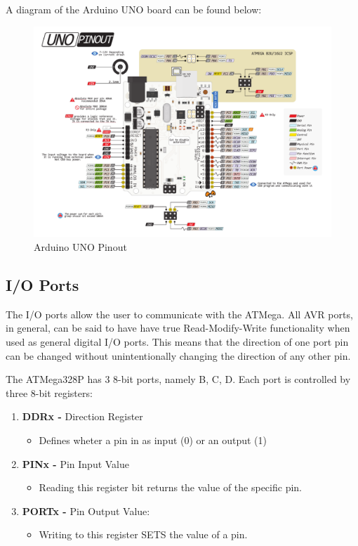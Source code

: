 A diagram of the Arduino UNO board can be found below:

\begin{figure}[H]
    \centering
    \includegraphics[scale = 0.50]{Graphics/MICROS/Practice 1/ARDUINO/BOARD.pdf}
    \caption{Arduino UNO Pinout~\autocite{BQ_ARDUINO}}
    \label{fig:ARDUINO_UNO_BOARD}
\end{figure}

\subsection{I/O Ports}

The I/O ports allow the user to communicate with the ATMega. All AVR ports, in general, can be said to have have true Read-Modify-Write functionality when used as general digital I/O ports. This means that the direction of one port pin can be changed without unintentionally changing the direction of any other pin.\medskip

The ATMega328P has 3 8-bit ports, namely B, C, D. Each port is controlled by three 8-bit registers:

\begin{enumerate}
    \item \textbf{DDRx -} Direction Register
        \begin{itemize}
            \item Defines wheter a pin in as input (0) or an output (1)
        \end{itemize}
    \item \textbf{PINx -} Pin Input Value
        \begin{itemize}
            \item Reading this register bit returns the value of the specific pin.
        \end{itemize}
    \item \textbf{PORTx - } Pin Output Value:
        \begin{itemize}
            \item Writing to this register SETS the value of a pin.
        \end{itemize}
\end{enumerate}

